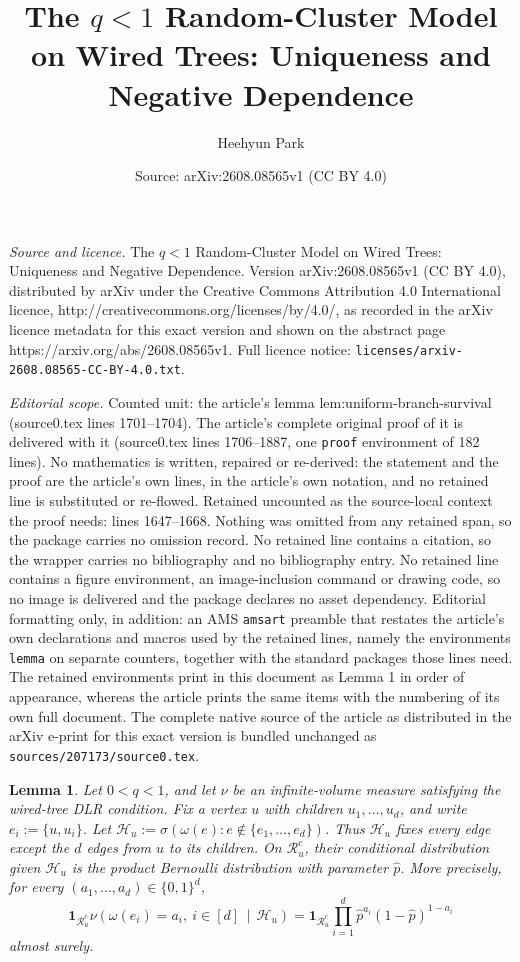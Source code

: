 \documentclass[10pt,a4paper]{amsart}
\title{The $q<1$ Random-Cluster Model on Wired Trees: Uniqueness and Negative Dependence}
\author{Heehyun Park}
\date{Source: arXiv:2608.08565v1 (CC BY 4.0)}
\newtheorem{lemma}{Lemma}
\begin{document}
\maketitle

\noindent\emph{Source and licence.} The $q<1$ Random-Cluster Model on Wired Trees: Uniqueness and Negative Dependence. Version arXiv:2608.08565v1 (CC BY 4.0), distributed by arXiv under the Creative Commons Attribution 4.0 International licence, http://creativecommons.org/licenses/by/4.0/, as recorded in the arXiv licence metadata for this exact version and shown on the abstract page https://arxiv.org/abs/2608.08565v1. Full licence notice: \texttt{licenses/arxiv-2608.08565-CC-BY-4.0.txt}.\par\smallskip

\noindent\textit{Editorial scope.} Counted unit: the article's lemma lem:uniform-branch-survival (source0.tex lines 1701--1704). The article's complete original proof of it is delivered with it (source0.tex lines 1706--1887, one \texttt{proof} environment of 182 lines). No mathematics is written, repaired or re-derived: the statement and the proof are the article's own lines, in the article's own notation, and no retained line is substituted or re-flowed.  Retained uncounted as the source-local context the proof needs: lines 1647--1668.  Nothing was omitted from any retained span, so the package carries no omission record.  No retained line contains a citation, so the wrapper carries no bibliography and no bibliography entry.  No retained line contains a figure environment, an image-inclusion command or drawing code, so no image is delivered and the package declares no asset dependency.  Editorial formatting only, in addition: an AMS \texttt{amsart} preamble that restates the article's own declarations and macros used by the retained lines, namely the environments \texttt{lemma} on separate counters, together with the standard packages those lines need.  The retained environments print in this document as Lemma 1 in order of appearance, whereas the article prints the same items with the numbering of its own full document.  The complete native source of the article as distributed in the arXiv e-print for this exact version is bundled unchanged as \texttt{sources/207173/source0.tex}.
\begin{lemma}
\label{lem:conditional-star-factorization}
Let $0<q<1$, and let $\nu$ be an infinite-volume measure satisfying the wired-tree DLR condition. Fix a vertex $u$ with children $u_1,\ldots,u_d$, and write $e_i:=\{u,u_i\}$. Let $\mathcal H_u := \sigma\left(\omega(e):e\notin\{e_1,\ldots,e_d\}\right)$. Thus $\mathcal H_u$ fixes every edge except the $d$ edges from $u$ to
its children. On $\mathcal R_u^c$, their conditional distribution given
$\mathcal H_u$ is the product Bernoulli distribution with parameter
$\widehat p$. More precisely, for every
$(a_1,\ldots,a_d)\in\{0,1\}^d$,
\[
    \mathbf 1_{\mathcal R_u^c}
    \nu\left(
        \omega(e_i)=a_i,\ i\in[d]
        \,\middle|\,
        \mathcal H_u
    \right)
    =
    \mathbf 1_{\mathcal R_u^c}
    \prod_{i=1}^d
    \widehat p^{a_i}
    (1-\widehat p)^{1-a_i}
\]
almost surely.
\end{lemma}
\end{document}
